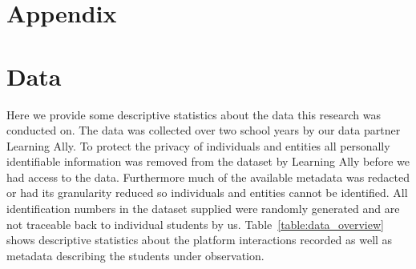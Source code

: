 \documentclass{article}
\begin{document}
\FloatBarrier



\clearpage

\appendix
\section*{{\huge Appendix}}
\section{Data}
\FloatBarrier
Here we provide some descriptive statistics about the data this research was conducted on.  The data  was collected over two school years by our data partner Learning Ally. To protect the privacy of individuals and entities all personally identifiable information was removed from the dataset by Learning Ally before we had access to the data. Furthermore much of the available metadata was redacted or had its granularity reduced so individuals and entities cannot be identified. All identification numbers in the dataset supplied were randomly generated and are not traceable back to individual students by us. Table~\ref{table:data_overview} shows descriptive statistics about the platform interactions recorded as well as metadata describing the students under observation.
\end{document}
